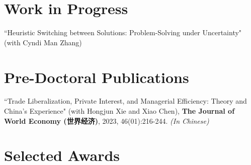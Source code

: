\documentclass[a4paper,10pt]{article}
\begin{document}
\section{Work in Progress}
\begin{enumerate}[itemsep=0pt,label={[\arabic*]}]
    \item {``Heuristic Switching between Solutions: Problem-Solving under Uncertainty" { (with Cyndi Man Zhang)  } } 
\end{enumerate}
\section{Pre-Doctoral Publications}
\begin{enumerate}[label={[\arabic*]}]
    \item ``Trade Liberalization, Private Interest, and Managerial Efficiency: Theory and China's Experience" {(with Hongjun Xie and Xiao Chen), \textbf{The Journal of World Economy (世界经济)}, 2023, 46(01):216-244. \textit{(In Chinese)}}
\end{enumerate}
\section{Selected Awards}
\end{document}
